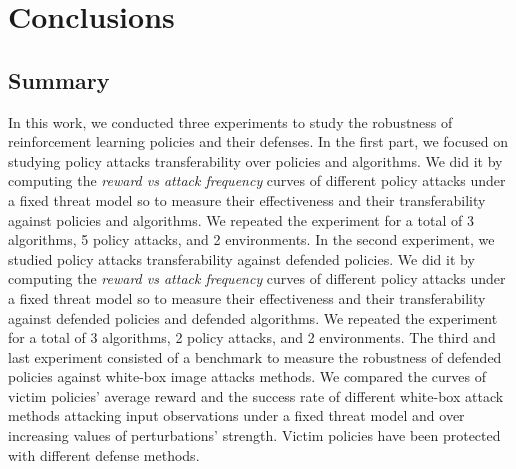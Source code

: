 \chapter{Conclusions}
\label{sec:conclusions}

\section{Summary}
In this work, we conducted three experiments to study the robustness of reinforcement learning policies and their defenses. In the first part, we focused on studying policy attacks transferability over policies and algorithms. We did it by computing the {\it reward vs attack frequency} curves of different policy attacks under a fixed threat model so to measure their effectiveness and their transferability against policies and algorithms. We repeated the experiment for a total of 3 algorithms, 5 policy attacks, and 2 environments. In the second experiment, we studied policy attacks transferability against defended policies. We did it by computing the {\it reward vs attack frequency} curves of different policy attacks under a fixed threat model so to measure their effectiveness and their transferability against defended policies and defended algorithms. We repeated the experiment for a total of 3 algorithms, 2 policy attacks, and 2 environments. The third and last experiment consisted of a benchmark to measure the robustness of defended policies against white-box image attacks methods. We compared the curves of victim policies’ average reward and the success rate of different white-box attack methods attacking input observations under a fixed threat model and over increasing values of perturbations’ strength. Victim policies have been protected with different defense methods.

